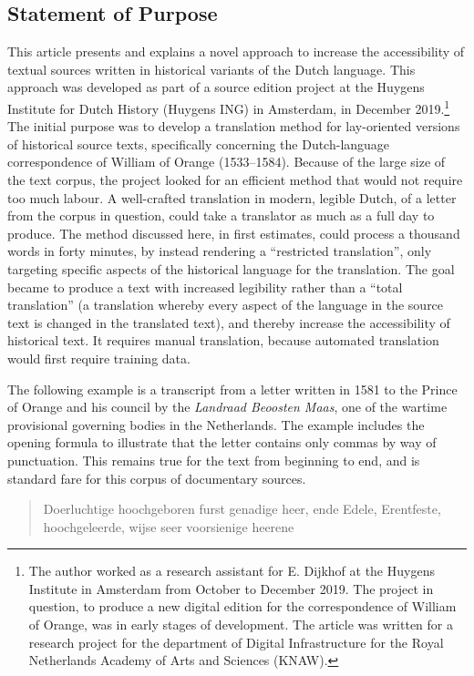 \begin{paper}
\section{Statement of Purpose} 
This article presents and explains a novel approach to increase the
accessibility of textual sources written in historical variants of the
Dutch language. This approach was developed as part of a source edition
project at the Huygens Institute for Dutch History (Huygens ING) in
Amsterdam, in December 2019.\footnote{The author worked as a research
  assistant for E. Dijkhof at the Huygens Institute in Amsterdam from
  October to December 2019. The project in question, to produce a new
  digital edition for the correspondence of William of Orange, was in
  early stages of development. The article was written for a research project for
  the department of Digital Infrastructure for the Royal Netherlands
  Academy of Arts and Sciences (KNAW).} The initial purpose was to
develop a translation method for lay-oriented versions of historical
source texts, specifically concerning the Dutch-language correspondence
of William of Orange (1533--1584). Because of the large size of the text
corpus, the project looked for an efficient method that would not
require too much labour. A well-crafted translation in modern, legible
Dutch, of a letter from the corpus in question, could take a translator
as much as a full day to produce. The method discussed here, in first
estimates, could process a thousand words in forty minutes, by instead
rendering a ``restricted translation'', only targeting specific aspects of
the historical language for the translation. The goal became to produce
a text with increased legibility rather than a ``total translation'' (a
translation whereby every aspect of the language in the source text is
changed in the translated text), and thereby increase the accessibility
of historical text. It requires manual translation, because automated
translation would first require training data.

The following example is a transcript from a letter written in 1581 to
the Prince of Orange and his council by the \emph{Landraad Beoosten
Maas}, one of the wartime provisional governing bodies in the
Netherlands. The example includes the opening formula to illustrate that
the letter contains only commas by way of punctuation. This remains true
for the text from beginning to end, and is standard fare for this corpus
of documentary sources.

\begin{quote}
Doerluchtige hoochgeboren furst genadige heer, ende Edele, Erentfeste,
hoochgeleerde, wijse seer voorsienige heerene


\end{quote}
\end{paper}

